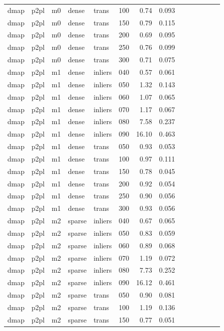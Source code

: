 \begin{table}[htbp]
\begin{tabular}{llllllrrrrrrrr}
  dmap & p2pl & m0 & dense & trans & 100 & 0.74 & 0.093 \\
  dmap & p2pl & m0 & dense & trans & 150 & 0.79 & 0.115 \\
  dmap & p2pl & m0 & dense & trans & 200 & 0.69 & 0.095 \\
  dmap & p2pl & m0 & dense & trans & 250 & 0.76 & 0.099 \\
  dmap & p2pl & m0 & dense & trans & 300 & 0.71 & 0.075 \\
  dmap & p2pl & m1 & dense & inliers & 040 & 0.57 & 0.061 \\
  dmap & p2pl & m1 & dense & inliers & 050 & 1.32 & 0.143 \\
  dmap & p2pl & m1 & dense & inliers & 060 & 1.07 & 0.065 \\
  dmap & p2pl & m1 & dense & inliers & 070 & 1.17 & 0.067 \\
  dmap & p2pl & m1 & dense & inliers & 080 & 7.58 & 0.237 \\
  dmap & p2pl & m1 & dense & inliers & 090 & 16.10 & 0.463 \\
  dmap & p2pl & m1 & dense & trans & 050 & 0.93 & 0.053 \\
  dmap & p2pl & m1 & dense & trans & 100 & 0.97 & 0.111 \\
  dmap & p2pl & m1 & dense & trans & 150 & 0.78 & 0.045 \\
  dmap & p2pl & m1 & dense & trans & 200 & 0.92 & 0.054 \\
  dmap & p2pl & m1 & dense & trans & 250 & 0.90 & 0.056 \\
  dmap & p2pl & m1 & dense & trans & 300 & 0.93 & 0.056 \\
  dmap & p2pl & m2 & sparse & inliers & 040 & 0.67 & 0.065 \\
  dmap & p2pl & m2 & sparse & inliers & 050 & 0.83 & 0.059 \\
  dmap & p2pl & m2 & sparse & inliers & 060 & 0.89 & 0.068 \\
  dmap & p2pl & m2 & sparse & inliers & 070 & 1.19 & 0.072 \\
  dmap & p2pl & m2 & sparse & inliers & 080 & 7.73 & 0.252 \\
  dmap & p2pl & m2 & sparse & inliers & 090 & 16.12 & 0.461 \\
  dmap & p2pl & m2 & sparse & trans & 050 & 0.90 & 0.081 \\
  dmap & p2pl & m2 & sparse & trans & 100 & 1.19 & 0.136 \\
  dmap & p2pl & m2 & sparse & trans & 150 & 0.77 & 0.051 \\

\end{tabular}
\end{table}

